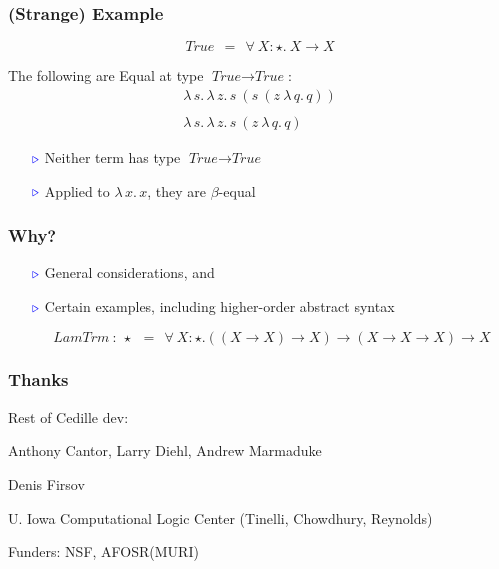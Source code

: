 \documentclass[11pt]{beamer}
\newcommand{\myb}[0]{\ensuremath{\textcolor{blue}{\triangleright}}}
\begin{document}
\begin{frame}
  \frametitle{(Strange) Example}

  \[
  \textit{True}\ \ =\ \ \forall\ X:\star.\ X \to X
  \]

  The following are Equal at type $\textit{True}\to\textit{True}$:
  \[
  \begin{array}{l}
    \lambda\,s.\,\lambda\,z.\, s\ (s\ (z\ \lambda\, q.\,q))\\ \\
    \lambda\,s.\,\lambda\,z.\, s\ (z\ \lambda\, q.\,q)
  \end{array}
  \]

  \begin{itemize}
  \item[$\myb$] Neither term has type $\textit{True}\to\textit{True}$
  \item[$\myb$] Applied to $\lambda\,x.\,x$, they are $\beta$-equal
  \end{itemize}
\end{frame}

\begin{frame}
  \frametitle{Why?}

  \begin{itemize}
  \item[$\myb$] General considerations, and

\vspace{1cm}

  \item[$\myb$] Certain examples, including higher-order abstract syntax

    \[
    \textit{LamTrm}\ : \ \star \ \ = \ \ \forall\ X:\star.((X \to X) \to X) \to (X \to X \to X) \to X
    \]
    \end{itemize}
\end{frame}

\begin{frame}
  \frametitle

\end{frame}

\begin{frame}
  \frametitle{Thanks}


  Rest of Cedille dev:
  
  \hspace{1cm} Anthony Cantor, Larry Diehl, Andrew Marmaduke

\vspace{1cm}

  Denis Firsov

\vspace{1cm}

  U. Iowa Computational Logic Center (Tinelli, Chowdhury, Reynolds)

\vspace{1cm}

  Funders: NSF, AFOSR(MURI)

\end{frame}
\end{document}
